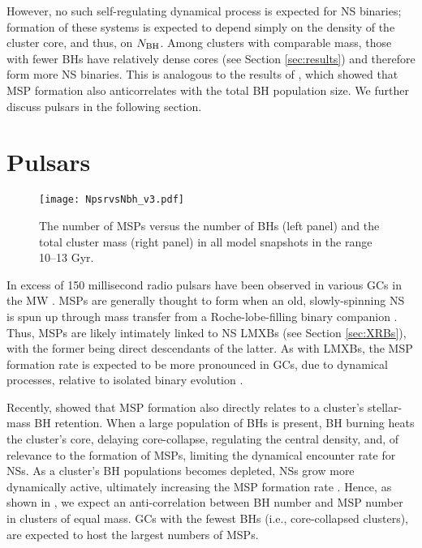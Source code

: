 \documentclass[twocolumn,tighten]{aastex63}
\begin{document}
However, no such self-regulating dynamical process is expected for NS binaries; formation of these systems is expected to depend simply on the density of the cluster core, and thus, on $N_{\rm{BH}}$. Among clusters with comparable mass, those with fewer BHs have relatively dense cores (see Section \ref{sec:results}) and therefore form more NS binaries. This is analogous to the results of \citet{Ye2018}, which showed that MSP formation also anticorrelates with the total BH population size. We further discuss pulsars in the following section.

\section{Pulsars}
\label{sec:pulsars}

\begin{figure*}
\begin{center}
\texttt{[image: NpsrvsNbh\_v3.pdf]}
\caption{\footnotesize \label{fig:pulsars}The number of MSPs versus the number of BHs (left panel) and the total cluster mass (right panel) in all model snapshots in the range 10--13 Gyr.}
\end{center}
\end{figure*}

In excess of 150 millisecond radio pulsars have been observed in various GCs in the MW \citep[for a recent review, see][]{Ransom2008}. MSPs are generally thought to form when an old, slowly-spinning NS is spun up through mass transfer from a Roche-lobe-filling binary companion \citep[e.g.,][]{Rappaport1995,Tauris2012}. Thus, MSPs are likely intimately linked to NS LMXBs (see Section \ref{sec:XRBs}), with the former being direct descendants of the latter. As with LMXBs, the MSP formation rate is expected to be more pronounced in GCs, due to dynamical processes, relative to isolated binary evolution \citep[e.g.,][]{Clark1975,Hut1992,Bahramian2013,Ye2018}.

Recently, \citet{Ye2018} showed that MSP formation also directly relates to a cluster's stellar-mass BH retention. When a large population of BHs is present, BH burning heats the cluster's core, delaying core-collapse, regulating the central density, and, of relevance to the formation of MSPs, limiting the dynamical encounter rate for NSs. As a cluster's BH populations becomes depleted, NSs grow more dynamically active, ultimately increasing the MSP formation rate \citep[see also][]{Fragione2018a}. Hence, as shown in \citet{Ye2018}, we expect an anti-correlation between BH number and MSP number in clusters of equal mass. GCs with the fewest BHs (i.e., core-collapsed clusters), are expected to host the largest numbers of MSPs.
\end{document}
